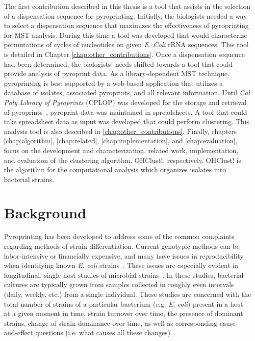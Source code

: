 \documentclass[12pt]{ucthesis}
\begin{document}
   The first contribution described in this thesis is a tool that assists in
   the selection of a dispensation sequence for pyroprinting. Initially, the
   biologists needed a way to select a dispensation sequence that maximizes the
   effectiveness of pyroprinting for MST analysis. During this time a tool was
   developed that would characterize permutations of cycles of nucleotides on
   given \textit{E. Coli} rRNA sequences. This tool is detailed in Chapter
   \ref{chap:other_contributions}. Once a dispensation sequence had been
   determined, the biologists' needs shifted towards a tool that could provide
   analysis of pyroprint data. As a library-dependent MST technique,
   pyroprinting is best supported by a web-based application that utilizes a
   database of isolates, associated pyroprints, and all relevant information.
   Until \textit{Cal Poly Library of Pyroprints} (CPLOP) was developed for the
   storage and retrieval of pyroprints~\cite{Jan:Thesis}, pyroprint data was
   maintained in spreadsheets. A tool that could take spreadsheet data as
   input was developed that could perform clustering. This analysis tool is
   also described in \ref{chap:other_contributions}. Finally, chapters
   \ref{chap:algorithm}, \ref{chap:related}, \ref{chap:implementation}, and
   \ref{chap:evaluation}, focus on the development and characterization,
   related work, implementation, and evaluation of the clustering algorithm,
   \textsf{OHClust!}, respectively. \textsf{OHClust!} is the algorithm for the
   computational analysis which organizes isolates into bacterial strains.

\chapter{Background}\label{chap:background}
   Pyroprinting has been developed to address some of the common complaints
   regarding methods of strain differentiation. Current genotypic methods can
   be labor-intensive or financially expensive, and many have issues in
   reproducibility when identifying known \textit{E. coli}
   strains~\cite{Gordon:StrainTyping, Scott:CurrentMST, Simpson:StateOf}. These
   issues are especially evident in longitudinal, single-host studies of microbial
   strains~\cite{Simpson:StateOf, Anderson:Diversity, Schlager:Clonal}. In
   these studies, bacterial cultures are typically grown from samples collected
   in roughly even intervals (daily, weekly, etc.) from a single individual.
   These studies are concerned with the total number of strains of a particular
   bacterium (e.g. \textit{E. coli}) present in a host at a given moment in
   time, strain turnover over time, the presence of dominant strains, change of
   strain dominance over time, as well as corresponding cause-and-effect
   questions (i.e. what causes all these changes)~\cite{Anderson:Diversity,
   Caugant:Diverse, Sears:Persist, Simpson:StateOf}.
   
\end{document}
